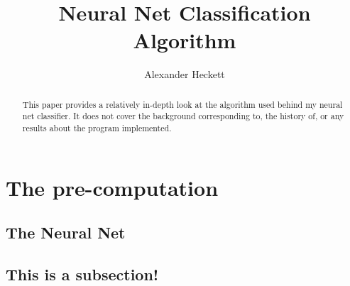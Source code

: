 \documentclass{article}
\begin{document}
\title{Neural Net Classification Algorithm}
\author{Alexander Heckett}
\maketitle
\begin{abstract}
This paper provides a relatively in-depth look at the algorithm used behind my neural net classifier. It does not cover the background corresponding to, the history of, or any results about the program implemented. 
\end{abstract}
\tableofcontents
\section{The pre-computation}
\subsection{The Neural Net}
\subsection{This is a subsection!}
\end{document}
